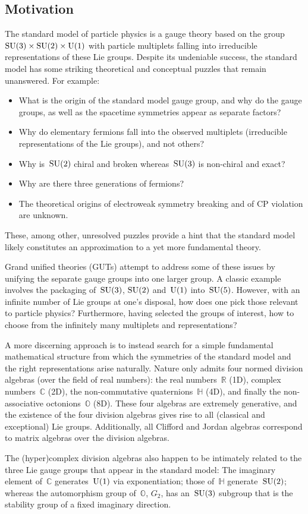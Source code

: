 \documentclass[reqno,11pt]{amsart}
\numberwithin{equation}{section}
\newcommand{\1}{\mbox{\rm 1 \hspace{-1.05 em} 1}}
\newcommand{\U}{{\rm{U}}}
\newcommand{\SU}{{\rm{SU}}}
\newcommand{\bitem}{\begin{itemize}[leftmargin=2em]}
\newcommand{\eitem}{\end{itemize}}
\newcommand{\itemD}{\item[{\raisebox{0.125em}{\tiny $\blacktriangleright$}}]}
\newcommand{\bb}[1]{\mathbb{#1}}
\begin{document}
\subsection{Motivation}
The standard model of particle physics is a gauge theory based on the group~$\SU(3)\times \SU(2)\times \U(1)$ with particle multiplets falling into irreducible representations of these Lie groups. Despite its undeniable success, the standard model has some striking theoretical and conceptual puzzles that remain unanswered. For example:
\bitem
\itemD  What is the origin of the standard model gauge group, and why do the gauge groups, as well as the spacetime symmetries appear as separate factors?
\itemD Why do elementary fermions fall into the observed multiplets (irreducible representations of the Lie groups), and not others?
\itemD Why is~$\SU(2)$ chiral and broken whereas~$\SU(3)$ is non-chiral and exact?
\itemD Why are there three generations of fermions?
\itemD The theoretical origins of electroweak symmetry breaking and of CP violation are unknown.
\eitem
These, among other, unresolved puzzles provide a hint that the standard model likely constitutes an approximation to a yet more fundamental theory.

Grand unified theories (GUTs) attempt to address some of these issues by unifying the separate gauge groups into one larger group. A classic example involves the packaging of~$\SU(3)$, $\SU(2)$ and~$\U(1)$ into~$\SU(5)$. However, with an infinite number of  Lie groups at one's disposal, how does one pick those relevant to particle physics? Furthermore, having selected the groups of interest, how to choose from the infinitely many multiplets and representations?

A more discerning approach is to instead search for a simple fundamental mathematical structure from which the symmetries of the standard model and the right representations arise naturally. Nature only admits four normed division algebras (over the field of real numbers): the real numbers~$\mathbb{R}$ (1D), complex numbers~$\mathbb{C}$ (2D), the non-commutative quaternions~$\mathbb{H}$ (4D), and finally the non-associative octonions~$\mathbb{O}$ (8D). These four algebras are extremely generative, and the existence of the four division algebras gives rise to all (classical and exceptional) Lie groups. Additionally, all Clifford and Jordan algebras correspond to matrix algebras over the division algebras.

The (hyper)complex division algebras also happen to be intimately related to the three Lie gauge groups that appear in the standard model: The imaginary element of~$\bb{C}$ generates~$\U(1)$ via exponentiation; those of~$\bb{H}$
generate~$\SU(2)$; whereas the automorphism group of~$\bb{O}$, $G_2$, has an~$\SU(3)$ subgroup that is the stability group of a fixed imaginary direction.
\end{document}
